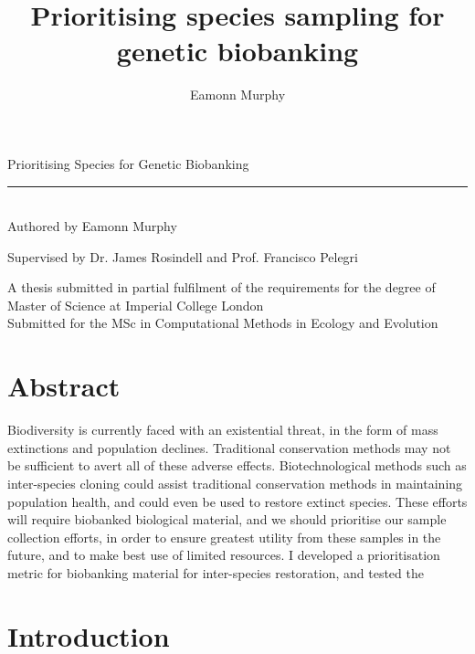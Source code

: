 \documentclass[12pt]{article}
\title{Prioritising species sampling for genetic biobanking}
\author{Eamonn Murphy}
\begin{document}
	\begin{titlepage}
		\newcommand{\HRule}{\rule{\linewidth}{0.6mm}}
		\begin{center}
			\vspace{\baselineskip}
			\huge
			Prioritising Species for Genetic Biobanking
			
			\HRule \\
			\large
			\vspace{5ex}
			Authored by Eamonn Murphy
			
			\medspace
			
			Supervised by Dr. James Rosindell and Prof. Francisco Pelegri
			
			\vspace*{\fill}
			\normalsize
			A thesis submitted in partial fulfilment of the requirements for the degree of
			Master of Science at Imperial College London
			\vspace{2ex} \\
			Submitted for the MSc in Computational Methods in Ecology and Evolution
	\end{center}

	\end{titlepage}
	
	\pagebreak
	
	\section{Abstract}
	Biodiversity is currently faced with an existential threat, in the form of
	mass extinctions and population declines. Traditional conservation methods
	may not be sufficient to avert all of these adverse effects. Biotechnological
	methods such as inter-species cloning could assist traditional conservation
	methods in maintaining population health, and could even be used to restore
	extinct species. These efforts will require biobanked biological material,
	and we should prioritise our sample collection efforts, in order to ensure
	greatest utility from these samples in the future, and to make best use
	of limited resources. I developed a prioritisation metric for biobanking
	material for inter-species restoration, and tested the 
	
	\section{Introduction}
\end{document}
